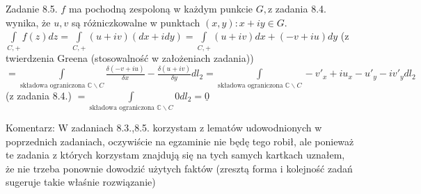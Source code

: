 \documentclass{article}
\begin{document}
Zadanie 8.5.
\newline
\newline
$f$ ma pochodną zespoloną w każdym punkcie $G,$z zadania 8.4. wynika, że $u,v$ są różniczkowalne w punktach $(x,y) :x+iy\in G$.
$
\int\limits_{C,+}f(z)dz=\int\limits_{C,+}(u+iv)(dx+idy)=\int\limits_{C,+}(u+iv)dx+(-v+iu)dy$ (z twierdzenia Greena (stosowalność w założeniach zadania))$
=\int\limits_{\text{składowa ograniczona }\mathbb{C}\backslash C}\frac{\delta(-v+iu)}{\delta x}-\frac{\delta(u+iv)}{\delta y}dl_2
=\int\limits_{\text{składowa ograniczona }\mathbb{C}\backslash C}-v'_x+iu_x-u'_y-iv'_ydl_2$ (z zadania 8.4.) $
=\int\limits_{\text{składowa ograniczona }\mathbb{C}\backslash C}0dl_2=\underline{0}
$
\newline
\newline

Komentarz:
\newline
\newline
W zadaniach 8.3.,8.5. korzystam z lematów udowodnionych w poprzednich zadaniach, oczywiście na egzaminie nie będę tego robił, ale ponieważ te zadania z których korzystam
znajdują się na tych samych kartkach uznałem, że nie trzeba ponownie dowodzić użytych faktów (zresztą forma i kolejność zadań sugeruje takie właśnie rozwiązanie)
\end{document}
